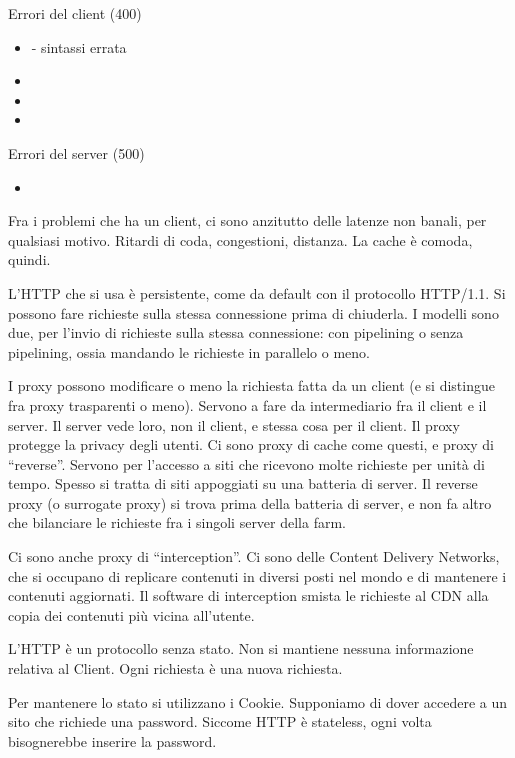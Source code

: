 Errori del client (400)

\begin{itemize}
    \item {} - sintassi errata
    \item {}
    \item {}
    \item {}
\end{itemize}

Errori del server (500)

\begin{itemize}
    \item {}
\end{itemize}

Fra i problemi che ha un client, ci sono anzitutto delle latenze non banali, per qualsiasi motivo. Ritardi di coda, congestioni, distanza. La cache \`e comoda, quindi.

L'HTTP che si usa \`e persistente, come da default con il protocollo HTTP/1.1. Si possono fare richieste sulla stessa connessione prima di chiuderla. I modelli sono due, per l'invio di richieste sulla stessa connessione: con pipelining o senza pipelining, ossia mandando le richieste in parallelo o meno.

I proxy possono modificare o meno la richiesta fatta da un client (e si distingue fra proxy trasparenti o meno). Servono a fare da intermediario fra il client e il server. Il server vede loro, non il client, e stessa cosa per il client. Il proxy protegge la privacy degli utenti. Ci sono proxy di cache come questi, e proxy di ``reverse''. Servono per l'accesso a siti che ricevono molte richieste per unit\`a di tempo. Spesso si tratta di siti appoggiati su una batteria di server. Il reverse proxy (o surrogate proxy) si trova prima della batteria di server, e non fa altro che bilanciare le richieste fra i singoli server della farm.

Ci sono anche proxy di ``interception''. Ci sono delle Content Delivery Networks, che si occupano di replicare contenuti in diversi posti nel mondo e di mantenere i contenuti aggiornati. Il software di interception smista le richieste al CDN alla copia dei contenuti pi\`u vicina all'utente.

L'HTTP \`e un protocollo senza stato. Non si mantiene nessuna informazione relativa al Client. Ogni richiesta \`e una nuova richiesta.

Per mantenere lo stato si utilizzano i Cookie. Supponiamo di dover accedere a un sito che richiede una password. Siccome HTTP \`e stateless, ogni volta bisognerebbe inserire la password.

